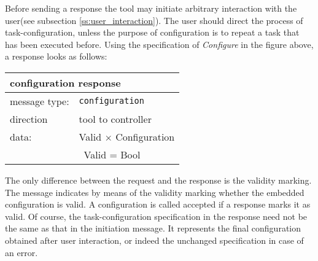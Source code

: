\documentclass{article}
\newcommand{\msg}[1]{\texttt{#1}}
\begin{document}
   Before sending a response the tool may initiate arbitrary interaction with
   the user(see subsection \ref{ss:user_interaction}). The user should direct
   the process of task-configuration, unless the purpose of configuration is to
   repeat a task that has been executed before. Using the specification of
   \textit{Configure} in the figure above, a response looks as follows:

   \begin{table}[H]
    \begin{center}
     \begin{tabular}{|ll|}
      \hline
       \multicolumn{2}{|l|}{\textbf{configuration response}} \\
      \hline
       message type:   & \msg{configuration} \\
      \hline
       direction       & tool to controller \\
       data:           & Valid $\times$ Configuration \\
                       & \ Valid = Bool \\
      \hline
     \end{tabular}
    \end{center}
    \vspace{-0.4cm}
   \end{table}

   \noindent The only difference between the request and the response is
   the validity marking. The message indicates by means of the validity marking
   whether the embedded configuration is valid. A configuration is called
   accepted if a response marks it as valid. Of course, the task-configuration
   specification in the response need not be the same as that in the initiation
   message. It represents the final configuration obtained after user
   interaction, or indeed the unchanged specification in case of an error.


  \pagebreak
\end{document}
